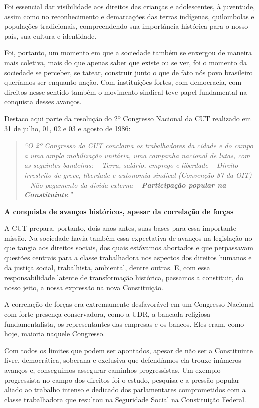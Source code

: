 Foi essencial dar visibilidade aos direitos das crianças e adolescentes,
à juventude, assim como no reconhecimento e demarcações das terras
indígenas, quilombolas e populações tradicionais, compreendendo sua
importância histórica para o nosso país, sua cultura e identidade.

Foi, portanto, um momento em que a sociedade também se enxergou de
maneira mais coletiva, mais do que apenas saber que existe ou se ver,
foi o momento da sociedade se perceber, se tatear, construir junto o que
de fato nós povo brasileiro queríamos ser enquanto nação. Com
instituições fortes, com democracia, com direitos nesse sentido também o
movimento sindical teve papel fundamental na conquista desses avanços.

Destaco aqui parte da resolução do 2º Congresso Nacional da CUT
realizado em 31 de julho, 01, 02 e 03 e agosto de 1986:

\begin{quote}
\emph{``O 2º Congresso da CUT conclama os trabalhadores da cidade e do
campo a uma ampla mobilização unitária, uma campanha nacional de lutas,
com as seguintes bandeiras: -- Terra, salário, emprego e liberdade --
Direito irrestrito de greve, liberdade e autonomia sindical (Convenção
87 da OIT) -- Não pagamento da dívida externa -- \textbf{Participação
popular na Constituinte}.'' }
\end{quote}

\textbf{A conquista de avanços históricos, apesar da correlação de
forças }

A CUT prepara, portanto, dois anos antes, suas bases para essa
importante missão. Na sociedade havia também essa expectativa de avanços
na legislação no que tangia aos direitos sociais, dos quais estávamos
abortados e que perpassavam questões centrais para a classe trabalhadora
nos aspectos dos direitos humanos e da justiça social, trabalhista,
ambiental, dentre outras. E, com essa responsabilidade latente de
transformação histórica, passamos a constituir, do nosso jeito, a nossa
expressão na nova Constituição.

A correlação de forças era extremamente desfavorável em um Congresso
Nacional com forte presença conservadora, como a UDR, a bancada
religiosa fundamentalista, os representantes das empresas e os bancos.
Eles eram, como hoje, maioria naquele Congresso.

Com todos os limites que podem ser apontados, apesar de não ser a
Constituinte livre, democrática, soberana e exclusiva que defendíamos
ela trouxe inúmeros avanços e, conseguimos assegurar caminhos
progressistas. Um exemplo progressista no campo dos direitos foi o
estudo, pesquisa e a pressão popular aliado ao trabalho intenso e
dedicado dos parlamentares comprometidos com a classe trabalhadora que
resultou na Seguridade Social na Constituição Federal.

